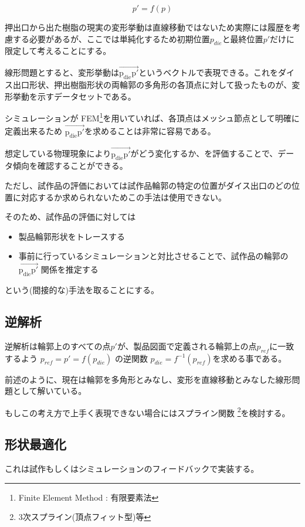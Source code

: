 \documentclass[report]{jlreq}
\begin{document}
\[p' = f(p)\]

押出口から出た樹脂の現実の変形挙動は直線移動ではないため実際には履歴を考慮する必要があるが、ここでは単純化するため初期位置$p_{die}$と最終位置$p'$だけに限定して考えることにする。

線形問題とすると、変形挙動は$\overrightarrow{\mathrm{p_{die} p'}}$というベクトルで表現できる。これをダイス出口形状、押出樹脂形状の両輪郭の多角形の各頂点に対して扱ったものが、変形挙動を示すデータセットである。

シミュレーションが FEM\footnote{Finite Element Method : 有限要素法 }を用いていれば、各頂点はメッシュ節点として明確に定義出来るため $\overrightarrow{\mathrm{p_{die} p'}}$を求めることは非常に容易である。

想定している物理現象により$\overrightarrow{\mathrm{p_{die} p'}}$がどう変化するか、を評価することで、データ傾向を確認することができる。

ただし、試作品の評価においては試作品輪郭の特定の位置がダイス出口のどの位置に対応するか求められないためこの手法は使用できない。

そのため、試作品の評価に対しては

\begin{itemize}
  \item 製品輪郭形状をトレースする
  \item 事前に行っているシミュレーションと対比させることで、試作品の輪郭の $\overrightarrow{\mathrm{p_{die} p'}}$ 関係を推定する
\end{itemize}

という({\small 間接的な})手法を取ることにする。

\subsection{逆解析}
逆解析は輪郭上のすべての点$p'$が、製品図面で定義される輪郭上の点$p_{ref}$に一致するよう $p_{ref} = p' = f(p_{die})$ の逆関数 $p_{die} = f^{-1}(p_{ref})$を求める事である。

前述のように、現在は輪郭を多角形とみなし、変形を直線移動とみなした線形問題として解いている。

もしこの考え方で上手く表現できない場合にはスプライン関数 \footnote{3次スプライン(頂点フィット型)等}を検討する。


\subsection{形状最適化}
これは試作もしくはシミュレーションのフィードバックで実装する。
\end{document}
